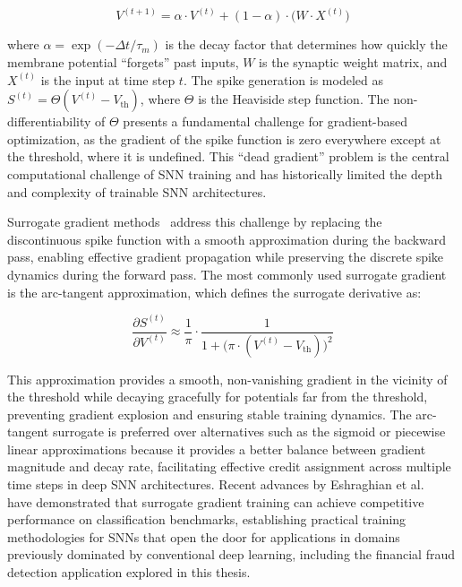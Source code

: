 \begin{equation}
V^{(t+1)} = \alpha \cdot V^{(t)} + (1 - \alpha) \cdot \bigl(W \cdot X^{(t)}\bigr)
\end{equation}

where $\alpha = \exp(-\Delta t / \tau_m)$ is the decay factor that determines
how quickly the membrane potential ``forgets'' past inputs, $W$ is the synaptic
weight matrix, and $X^{(t)}$ is the input at time step $t$. The spike generation
is modeled as $S^{(t)} = \Theta(V^{(t)} - V_{\text{th}})$, where $\Theta$ is the
Heaviside step function. The non-differentiability of $\Theta$ presents a
fundamental challenge for gradient-based optimization, as the gradient of the
spike function is zero everywhere except at the threshold, where it is
undefined. This ``dead gradient'' problem is the central computational challenge
of SNN training and has historically limited the depth and complexity of
trainable SNN architectures.

Surrogate gradient methods~\cite{zenke2021remarkable} address this challenge by
replacing the discontinuous spike function with a smooth approximation during
the backward pass, enabling effective gradient propagation while preserving the
discrete spike dynamics during the forward pass. The most commonly used
surrogate gradient is the arc-tangent approximation, which defines the surrogate
derivative as:

\begin{equation}
\frac{\partial S^{(t)}}{\partial V^{(t)}} \approx \frac{1}{\pi} \cdot \frac{1}{1
+ \bigl(\pi \cdot (V^{(t)} - V_{\text{th}})\bigr)^2}
\end{equation}

This approximation provides a smooth, non-vanishing gradient in the vicinity of
the threshold while decaying gracefully for potentials far from the threshold,
preventing gradient explosion and ensuring stable training dynamics. The arc-
tangent surrogate is preferred over alternatives such as the sigmoid or
piecewise linear approximations because it provides a better balance between
gradient magnitude and decay rate, facilitating effective credit assignment
across multiple time steps in deep SNN architectures. Recent advances by
Eshraghian et al.~\cite{eshraghian2021training} have demonstrated that surrogate
gradient training can achieve competitive performance on classification
benchmarks, establishing practical training methodologies for SNNs that open the
door for applications in domains previously dominated by conventional deep
learning, including the financial fraud detection application explored in this
thesis.

